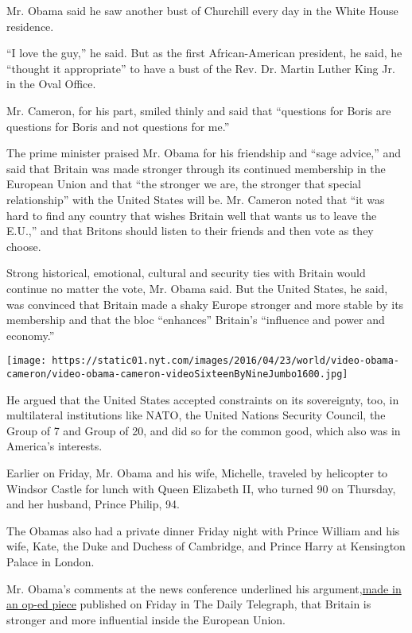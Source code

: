 Mr. Obama said he saw another bust of Churchill every day in the White
House residence.

``I love the guy,'' he said. But as the first African-American
president, he said, he ``thought it appropriate'' to have a bust of the
Rev. Dr. Martin Luther King Jr. in the Oval Office.

Mr. Cameron, for his part, smiled thinly and said that ``questions for
Boris are questions for Boris and not questions for me.''

The prime minister praised Mr. Obama for his friendship and ``sage
advice,'' and said that Britain was made stronger through its continued
membership in the European Union and that ``the stronger we are, the
stronger that special relationship'' with the United States will be. Mr.
Cameron noted that ``it was hard to find any country that wishes Britain
well that wants us to leave the E.U.,'' and that Britons should listen
to their friends and then vote as they choose.

Strong historical, emotional, cultural and security ties with Britain
would continue no matter the vote, Mr. Obama said. But the United
States, he said, was convinced that Britain made a shaky Europe stronger
and more stable by its membership and that the bloc ``enhances''
Britain's ``influence and power and economy.''

\texttt{[image: https://static01.nyt.com/images/2016/04/23/world/video-obama-cameron/video-obama-cameron-videoSixteenByNineJumbo1600.jpg]}

He argued that the United States accepted constraints on its
sovereignty, too, in multilateral institutions like NATO, the United
Nations Security Council, the Group of 7 and Group of 20, and did so for
the common good, which also was in America's interests.

Earlier on Friday, Mr. Obama and his wife, Michelle, traveled by
helicopter to Windsor Castle for lunch with Queen Elizabeth II, who
turned 90 on Thursday, and her husband, Prince Philip, 94.

The Obamas also had a private dinner Friday night with Prince William
and his wife, Kate, the Duke and Duchess of Cambridge, and Prince Harry
at Kensington Palace in London.

Mr. Obama's comments at the news conference underlined his
argument,\href{http://www.telegraph.co.uk/news/2016/04/21/as-your-friend-let-me-tell-you-that-the-eu-makes-britain-even-gr/}{made
in an op-ed piece} published on Friday in The Daily Telegraph, that
Britain is stronger and more influential inside the European Union.

